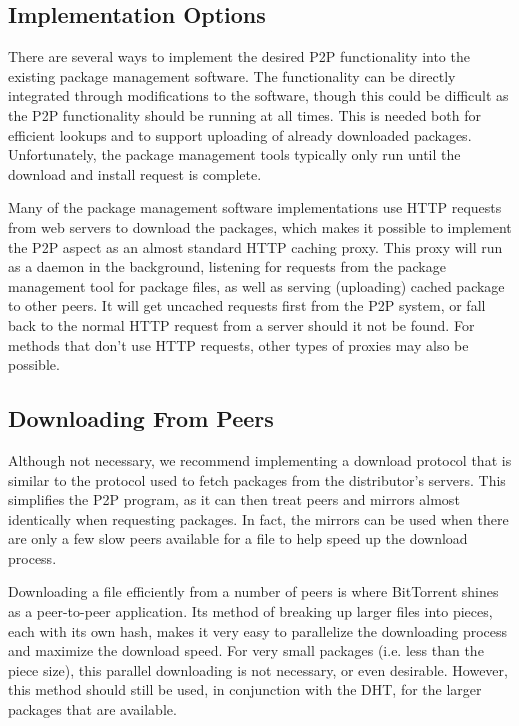 \documentclass[conference]{IEEEtran}
\begin{document}
\subsection{Implementation Options}
\label{imp_options}

There are several ways to implement the desired P2P functionality
into the existing package management software. The functionality can
be directly integrated through modifications to the software, though
this could be difficult as the P2P functionality should be running
at all times. This is needed both for efficient lookups and to
support uploading of already downloaded packages. Unfortunately, the
package management tools typically only run until the download and
install request is complete.

Many of the package management software implementations use HTTP
requests from web servers to download the packages, which makes it
possible to implement the P2P aspect as an almost standard HTTP
caching proxy. This proxy will run as a daemon in the background,
listening for requests from the package management tool for package
files, as well as serving (uploading) cached package to other peers.
It will get uncached requests first from the P2P system, or
fall back to the normal HTTP request from a server should it not
be found. For methods that don't use HTTP requests, other types of
proxies may also be possible.

\subsection{Downloading From Peers}
\label{downloading}

Although not necessary, we recommend implementing a download
protocol that is similar to the protocol used to fetch packages from
the distributor's servers. This simplifies the P2P program, as it
can then treat peers and mirrors almost identically when requesting
packages. In fact, the mirrors can be used when there are only a few
slow peers available for a file to help speed up the download
process.

Downloading a file efficiently from a number of peers is where
BitTorrent shines as a peer-to-peer application. Its method of
breaking up larger files into pieces, each with its own hash,
makes it very easy to parallelize the downloading process and
maximize the download speed. For very small packages (i.e. less than
the piece size), this parallel downloading is not necessary, or
even desirable. However, this method should still be used, in
conjunction with the DHT, for the larger packages that are
available.
\end{document}
